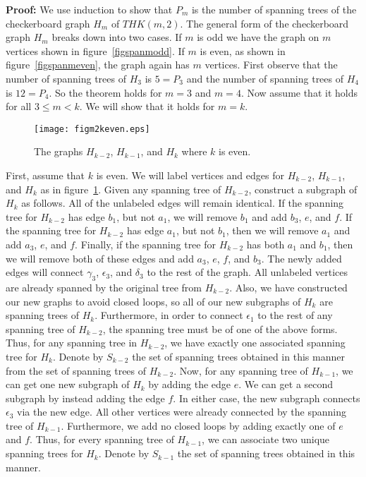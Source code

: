 \documentclass{amsart}
\begin{document}
{\noindent \textbf{Proof: }} We use induction to show that $P_m$ is the number of spanning trees of the checkerboard graph $H_m$ of $THK(m,2)$. The general form of the checkerboard graph $H_m$ breaks down into two cases.
If $m$ is odd we have the graph on $m$ vertices shown in figure~\ref{figspanmodd}. If $m$ is even, as shown in figure~\ref{figspanmeven},  the graph again has $m$ vertices.  First observe that the number of spanning trees of $H_{3}$ is $5=P_{3}$ and the number of spanning trees of $H_{4}$ is $12=P_{4}$.  So the theorem holds for $m=3$ and $m=4$.  Now assume that it holds for all $3 \leq m < k$.  We will show that it holds for $m = k$.

\begin{figure}[ht]
\begin{center}
\texttt{[image: figm2keven.eps]}
\caption{The graphs $H_{k-2}$, $H_{k-1}$, and $H_{k}$ where $k$ is even.}\label{figm2keven}
\end{center}
\end{figure} 

First, assume that $k$ is even.  We will label vertices and edges for $H_{k-2}$, $H_{k-1}$, and $H_{k}$ as in figure~\ref{figm2keven}. Given any spanning tree of $H_{k-2}$, construct a subgraph of $H_{k}$ as follows.  All of the unlabeled edges will remain identical.  If the spanning tree for $H_{k-2}$ has edge $b_{1}$, but not $a_{1}$, we will remove $b_{1}$ and add $b_{3}$, $e$, and $f$.  If the spanning tree for $H_{k-2}$ has edge $a_{1}$, but not $b_{1}$, then we will remove $a_{1}$ and add $a_{3}$, $e$, and $f$. Finally, if the spanning tree for $H_{k-2}$ has both $a_{1}$ and
$b_{1}$, then we will remove both of these edges and add $a_{3}$, $e$, $f$, and $b_{3}$.  The newly added edges will connect $\gamma_{3}$, $\epsilon_{3}$, and $\delta_{3}$ to the rest of the graph.  All unlabeled vertices are already spanned by the original tree from $H_{k-2}$. Also, we have constructed our new graphs to avoid closed loops, so all of our new subgraphs of $H_{k}$ are spanning trees of $H_{k}$. Furthermore, in order to connect $\epsilon_{1}$ to the rest of any spanning tree of $H_{k-2}$, the spanning tree must be of one of the above forms.   Thus, for any spanning tree in $H_{k-2}$, we have exactly one associated spanning tree for $H_{k}$.  Denote by $S_{k-2}$ the set of spanning trees obtained in this manner from the set of spanning trees of $H_{k-2}$. Now, for any spanning tree of $H_{k-1}$, we can get one new subgraph of $H_{k}$ by adding the edge $e$.  We can get a second subgraph by instead adding the edge $f$.  In either case, the new subgraph connects $\epsilon_{3}$ via the new edge.  All other vertices were already connected by the spanning tree of $H_{k-1}$. Furthermore, we add no closed loops by adding exactly one of $e$ and $f$.  Thus, for every spanning tree of $H_{k-1}$, we can associate two unique spanning trees for $H_{k}$.  Denote by $S_{k-1}$ the set of spanning trees obtained in this manner.
\end{document}
